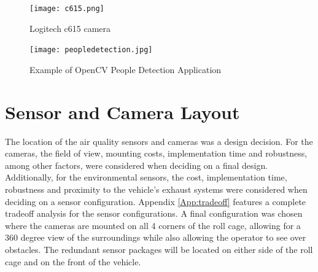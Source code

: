\begin{figure}[H]
	\centering
	\texttt{[image: c615.png]}
	\caption{Logitech c615 camera}
	\label{fig:logitechcam}
\end{figure}
\begin{figure}[H]
	\centering
	\texttt{[image: peopledetection.jpg]}
	\caption{Example of OpenCV People Detection Application}
	\label{fig:peopledetect}
	\end{figure}

\section{Sensor and Camera Layout}

The location of the air quality sensors and cameras was a design decision. For the cameras, the field of view, mounting costs, implementation time and robustness, among other factors, were considered when deciding on a final design. Additionally, for the environmental sensors, the cost, implementation time, robustness and proximity to the vehicle's exhaust systems were considered when deciding on a sensor configuration. Appendix \ref{App:tradeoff} features a complete tradeoff analysis for the sensor configurations. A final configuration was chosen where the cameras are mounted on all 4 corners of the roll cage, allowing for a 360 degree view of the surroundings while also allowing the operator to see over obstacles. The redundant sensor packages will be located on either side of the roll cage and on the front of the vehicle. 

